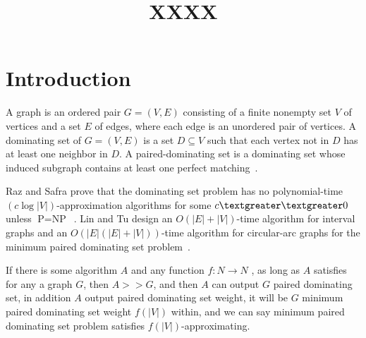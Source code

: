 \documentclass[12pt]{article}
\title{\textbf{XXXX}}
\date{}
\begin{document}
\maketitle

\section{Introduction}
A graph is an ordered pair $G=(V,E)$ consisting of a finite nonempty set $V$ of vertices and a set $E$ of edges, where each edge is an unordered pair of vertices. A dominating set of $G=(V,E)$ is a set $D \subseteq V$ such that each vertex not in $D$ has at least one neighbor in $D$. A paired-dominating set is a dominating set whose induced subgraph contains at least one perfect matching~\cite{1}.

Raz and Safra prove that the dominating set problem has no polynomial-time $(c \log|V|)$-approximation algorithms for some $c \textgreater\textgreater  0$ unless $\text{P}=\text{NP}$~\cite{2}.
Lin and Tu design an $O(|E|+|V|)$-time algorithm for interval graphs and an $O(|E|(|E|+|V|))$-time algorithm for circular-arc graphs for the minimum paired dominating set problem~\cite {3}.

If there is some algorithm $A$ and any function $f:N \to N$ , as long as $A$ satisfies for any a graph $G$, then $A >> G$, and then $A$ can output $G$ paired dominating set, in addition $A$ output paired dominating set weight, it will be $G$ minimum paired dominating set weight $f(|V|)$ within, and we can say minimum paired dominating set problem satisfies $f(|V|)$-approximating.  



\end{document}
